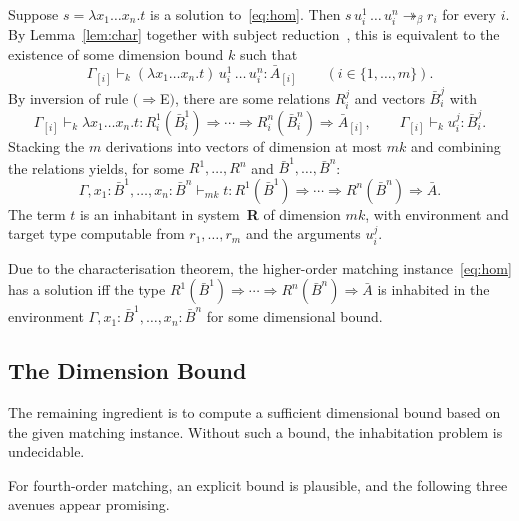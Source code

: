 \documentclass{easychair}
\theoremstyle{plain}%
\renewcommand{\:}{\mbox{:}\xspace}
\begin{document}
Suppose $s = \lambda x_1 \ldots x_n.t$ is a solution to~\eqref{eq:hom}.
Then $s\,u_i^1\,\ldots\,u_i^n \twoheadrightarrow_\beta r_i$ for every $i$.
By Lemma~\ref{lem:char} together with subject reduction~\cite{dsr2026sysR}, this is equivalent to the existence of some dimension bound $k$ such that
\begin{equation}\label{eq:applied}
\Gamma_{[i]} \vdash_k (\lambda x_1 \ldots x_n.t)\,u_i^1\,\ldots\,u_i^n : \bar{A}_{[i]} \qquad (i \in \{1, \ldots, m\}).
\end{equation}
By inversion of rule $(\Rightarrow$E$)$, there are some relations $R_i^j$ and vectors $\bar{B}_i^j$ with
\[
\Gamma_{[i]} \vdash_k \lambda x_1 \ldots x_n.t : R_i^1(\bar{B}_i^1) \Rightarrow \cdots \Rightarrow R_i^n(\bar{B}_i^n) \Rightarrow \bar{A}_{[i]},
\qquad
\Gamma_{[i]} \vdash_k u_i^j : \bar{B}_i^j.
\]
Stacking the $m$ derivations into vectors of dimension at most $mk$ and combining the relations yields, for some $R^1, \ldots, R^n$ and $\bar{B}^1, \ldots, \bar{B}^n$:
\[
\Gamma, x_1 : \bar{B}^1, \ldots, x_n : \bar{B}^n \vdash_{mk} t : R^1(\bar{B}^1) \Rightarrow \cdots \Rightarrow R^n(\bar{B}^n) \Rightarrow \bar{A}.
\]
The term $t$ is an inhabitant in system~\textbf{R} of dimension $mk$, with environment and target type computable from $r_1, \ldots, r_m$ and the arguments $u_i^j$.

Due to the characterisation theorem, the higher-order matching instance~\eqref{eq:hom} has a solution iff the type $R^1(\bar{B}^1) \Rightarrow \cdots \Rightarrow R^n(\bar{B}^n) \Rightarrow \bar{A}$ is inhabited in the environment $\Gamma, x_1 : \bar{B}^1, \ldots, x_n : \bar{B}^n$ for some dimensional bound.

\subsection{The Dimension Bound}

The remaining ingredient is to compute a sufficient dimensional bound based on the given matching instance.
Without such a bound, the inhabitation problem is undecidable.

For fourth-order matching, an explicit bound is plausible, and the following three avenues appear promising.
\end{document}
